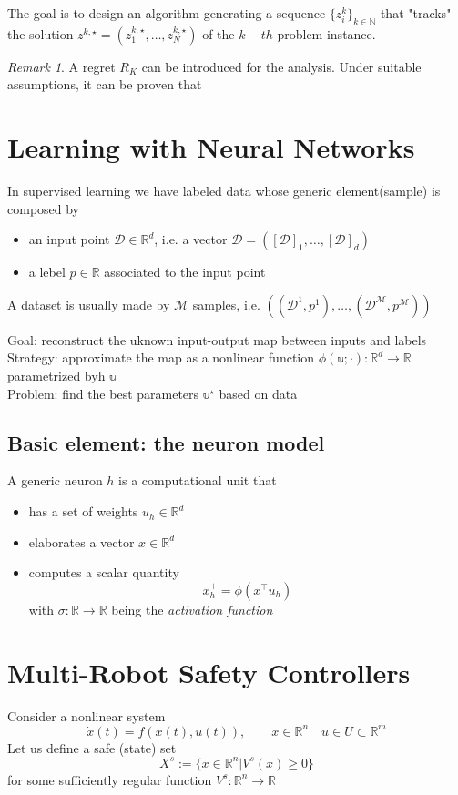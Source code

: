 \documentclass{book}
\newcommand{\R}{\mathbb{R}}
\newcommand{\N}{\mathbb{N}}
\theoremstyle{theoremv2}
\theoremstyle{defv2}
\theoremstyle{remark}
\newtheorem*{remark}{Remark}
\theoremstyle{remark}
\theoremstyle{definition}
\theoremstyle{definition}
\begin{document}
The goal is to design an algorithm generating a sequence $\{z_i^k\}_{k\in\N}$ that "tracks" the solution $z^{k,\star}=(z_1^{k,\star},\dots,z_N^{k,\star})$ of the $k-th$ problem instance.

\begin{remark}
    A regret $R_K$ can be introduced for the analysis. Under suitable assumptions, it can be proven that %
\end{remark}


\chapter{Learning with Neural Networks}
In supervised learning we have labeled data whose generic element(sample) is composed by 
\begin{itemize}
    \item an input point $\mathcal{D}\in\R^d$, i.e. a vector $\mathcal{D} = ([\mathcal{D}]_1,\dots,[\mathcal{D}]_d)$ 
        \item a lebel $p\in\R$ associated to the input point
\end{itemize}
A dataset is usually made by $\mathcal{M}$ samples, i.e. $((\mathcal{D}^1,p^1),\dots,(\mathcal{D}^\mathcal{M},p^\mathcal{M}))$

Goal: reconstruct the uknown input-output map between inputs and labels\\
Strategy: approximate the map as a nonlinear function $\phi(\mathbb{u};\cdot):\R^d\to\R$ parametrized byh $\mathbb{u}$\\
Problem: find the best parameters $\mathbb{u}^\star$ based on data

\section{Basic element: the neuron model}
A generic neuron $h$ is a computational unit that 
\begin{itemize}
    \item has a set of weights $u_h\in\R^d$ 
    \item elaborates a vector $x\in\R^d$
    \item computes a scalar quantity 
        \[
            x_h^+ = \phi(x^\top u_h)
        \]
        with $\sigma:\R\to\R$ being the \emph{activation function}
\end{itemize}


\chapter{Multi-Robot Safety Controllers}
Consider a nonlinear system 
\[
    \dot{x}(t) = f(x(t),u(t)), \qquad x\in\R^n \quad u\in U\subset \R^m
\]
Let us define a safe (state) set 
\[
    X^s := \{ x\in\R^n | V^s(x)\geq0 \}
\]
for some sufficiently regular function $V^s:\R^n\to\R$
\end{document}
